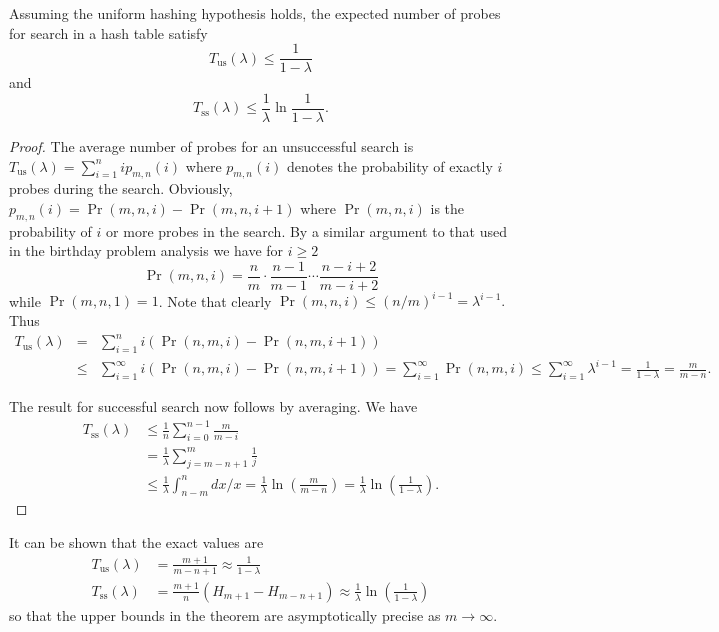\begin{Lemma}\label{lem:oadh}
Assuming the uniform hashing hypothesis holds, 
the expected number of probes for search in a hash table satisfy
$$
T_{\mathrm{us}}(\lambda) \leq \frac{1}{1-\lambda} 
$$
and
$$ 
T_{\mathrm{ss}}(\lambda) \leq \frac{1}{\lambda} \ln \frac{1}{1-\lambda}.
$$
\end{Lemma}

\begin{proof} 
The average number of probes for an
unsuccessful search is
\(
T_{\mathrm{us}}(\lambda) = \sum_{i=1}^{n}i p_{m,n}(i)
\)
where \(p_{m,n}(i)\) denotes the probability of exactly \(i\)
probes during the search. Obviously, 
\(p_{m,n}(i) = \Pr (m,n,i) - \Pr (m,n,i+1)\) where 
\(\Pr (m,n,i)\) is the probability of \(i\) or more probes
in the search. By a similar argument to that used in the
birthday problem analysis we have for $i\geq 2$
$$
\Pr (m,n,i) = \frac{n}{m}\cdot \frac{n-1}{m-1} \cdots \frac{n-i+2}{m-i+2}
$$
while $\Pr (m,n,1) = 1$.
Note that clearly $\Pr (m,n,i) \leq (n/m)^{i-1} = \lambda^{i-1}.$
Thus
\begin{eqnarray*}
T_{\mathrm{us}}(\lambda) & = &
\sum\limits_{i=1}^{n}i\left ( 
{\textstyle \Pr (n,m,i) - \Pr (n,m,i+1) }\right ) \\
& \le &
\sum\limits_{i=1}^{\infty}i\left ( 
{\textstyle \Pr (n,m,i) - \Pr (n,m,i+1)}\right ) 
= \sum\limits_{i=1}^{\infty} \Pr (n,m,i) 
\le  
\sum\limits_{i=1}^{\infty} \lambda^{i-1} = \frac{1}{1-\lambda} = \frac{m}{m-n}.
\end{eqnarray*}

The result for successful search now follows by averaging. We have
\begin{align*}
T_{\mathrm{ss}}(\lambda) & \leq \frac{1}{n} \sum_{i=0}^{n-1} \frac{m}{m-i} \\
& = \frac{1}{\lambda} \sum_{j=m-n+1}^m \frac{1}{j}\\
& \leq \frac{1}{\lambda} \int_{n-m}^n dx/x = \frac{1}{\lambda} \ln\left(\frac{m}{m-n}\right) = \frac{1}{\lambda}
\ln\left(\frac{1}{1-\lambda}\right).
\end{align*}
\end{proof}

\begin{note}
It can be shown that the exact values are
\begin{align*}
T_{\mathrm{us}}(\lambda) & = \frac{m+1}{m-n+1} \approx \frac{1}{1-\lambda}\\
T_{\mathrm{ss}}(\lambda) & = \frac{m+1}{n} \left( H_{m+1} - H_{m-n+1} \right) 
\approx \frac{1}{\lambda} \ln\left(\frac{1}{1-\lambda}\right)
\end{align*}
so that the upper bounds in the theorem are asymptotically precise as $m\to \infty$.
\end{note}

